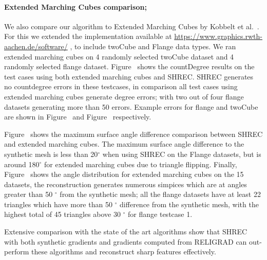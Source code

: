 \paragraph{Extended Marching Cubes comparison;}

We also compare our algorithm to Extended Marching Cubes by Kobbelt et al.~\cite{kbsh-fssev-01}. For this we extended the implementation available at \url{https://www.graphics.rwth-aachen.de/software/} \href{https://www.graphics.rwth-aachen.de/software/}{}, to include twoCube and Flange data types. We ran extended marching cubes on 4 randomly selected twoCube dataset and 4 randomly selected flange dataset. Figure~\protect{} shows the countDegree results on the test cases using both extended marching cubes and SHREC. SHREC generates no countdegree errors in these testcases, in comparison all test cases using extended marching cubes generate degree errors; with two out of four flange datasets generating more than 50 errors.
Example errors for flange and twoCube are shown in Figure~\protect{} and Figure~\protect{} respectively. 

Figure~\protect{} shows the maximum surface angle difference comparison between SHREC and extended marching cubes. The maximum surface angle difference to the synthetic mesh is less than 20$^\circ$ when using SHREC on the Flange datasets, but is around 180$^\circ$ for extended marching cubes due to triangle flipping. Finally, Figure~\protect{} shows the angle distribution for extended marching cubes on the 15 datasets, the reconstruction generates numerous simpices which are at angles greater than 50 $^\circ$ from the synthetic mesh; all the flange datasets have at least 22 triangles which have more than 50  $^\circ$ difference from the synthetic mesh, with the highest total of 45 triangles above 30 $^\circ$ for flange testcase 1.


Extensive comparison with the state of the art algorithms show that SHREC with both synthetic gradients and gradients computed from RELIGRAD can out-perform these algorithms and reconstruct sharp features effectively. 


